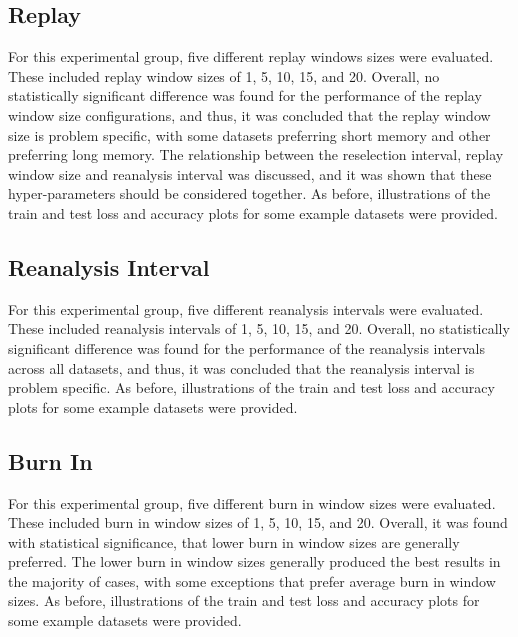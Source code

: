 \subsection{Replay}
\label{sec:conclusion:results:summary:replay}

For this experimental group, five different replay windows sizes were evaluated. These included replay window sizes of 1, 5, 10, 15, and 20. Overall, no statistically significant difference was found for the performance of the replay window size configurations, and thus, it was concluded that the replay window size is problem specific, with some datasets preferring short memory and other preferring long memory. The relationship between the reselection interval, replay window size and reanalysis interval was discussed, and it was shown that these hyper-parameters should be considered together. As before, illustrations of the train and test loss and accuracy plots for some example datasets were provided.


\subsection{Reanalysis Interval}
\label{sec:conclusion:results:summary:reanalysis}

For this experimental group, five different reanalysis intervals were evaluated. These included reanalysis intervals of 1, 5, 10, 15, and 20. Overall, no statistically significant difference was found for the performance of the reanalysis intervals across all datasets, and thus, it was concluded that the reanalysis interval is problem specific. As before, illustrations of the train and test loss and accuracy plots for some example datasets were provided.

\subsection{Burn In}
\label{sec:conclusion:results:summary:burn_in}

For this experimental group, five different burn in window sizes were evaluated. These included burn in window sizes of 1, 5, 10, 15, and 20. Overall, it was found with statistical significance, that lower burn in window sizes are generally preferred. The lower burn in window sizes generally produced the best results in the majority of cases, with some exceptions that prefer average burn in window sizes. As before, illustrations of the train and test loss and accuracy plots for some example datasets were provided.

